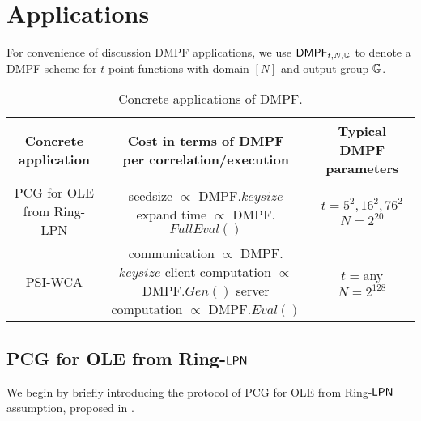 \section{Applications}
For convenience of discussion DMPF applications, we use ${\sf DMPF}_{t, N, \mathbb{G}}$ to denote a DMPF scheme for $t$-point functions with domain $[N]$ and output group $\mathbb{G}$. 

\begin{table*}
  \caption{Concrete applications of DMPF. }
  \label{tab:app_parameters}
	\begin{tabular}{ccc}
    \toprule
		Concrete application &\makecell{Cost in terms of DMPF\\per correlation/execution}& Typical DMPF parameters \\
    \midrule
		PCG for OLE from Ring-LPN &\makecell{seedsize $\propto$ DMPF.$keysize$\\expand time $\propto$ DMPF.$FullEval()$} & \makecell{$t = 5^2, 16^2, 76^2$\\$N = 2^{20}$}  \\
		PSI-WCA & \makecell{communication $\propto$ DMPF.$keysize$\\client computation $\propto$ DMPF.$Gen()$\\server computation $\propto$ DMPF.$Eval()$} & \makecell{$t = $any\\$N = 2^{128}$}\\
    \bottomrule
	\end{tabular}
\end{table*}

\subsection{PCG for OLE from Ring-${\sf LPN}$}

We begin by briefly introducing the protocol of PCG for OLE from Ring-${\sf LPN}$ assumption, proposed in \cite{cryptoeprint:2022/1035}. 

